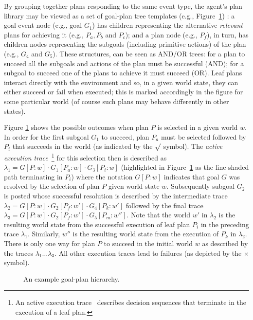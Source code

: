 By grouping together plans responding to the same event type, the agent's plan library may be viewed as a set of goal-plan tree templates (e.g., Figure~\ref{fig:confidence}) \cite{ShawBordini:AAMAS08}: a goal-event node (e.g., goal $G_1$) has children representing the alternative \emph{relevant} plans for achieving it (e.g., $P_a,P_b$ and $P_c$); and a plan node (e.g., $P_f$), in turn, has children nodes representing the subgoals (including primitive actions) of the plan (e.g., $G_4$ and $G_5$). These structures, can be seen as AND/OR trees: for a plan to succeed all the subgoals and actions of the plan must be successful (AND); for a subgoal to succeed one of the plans to achieve it must succeed (OR). Leaf plans interact directly with the environment and so, in a given world state, they can either succeed or fail when executed; this is marked accordingly in the figure for some particular world (of course such plans may behave differently in other states).


Figure \ref{fig:confidence} shows the possible outcomes when plan $P$ is selected in a given world $w$. In order for the first subgoal $G_1$ to succeed, plan $P_a$ must be selected followed by $P_i$ that succeeds in the world (as indicated by the $\surd$ symbol). The {\em active execution trace}~\footnote{An active execution trace~\cite{singh10:learning} describes decision sequences that terminate in the execution of a leaf plan.} for this selection then is described as $\lambda_1=G[P:w] \cdot G_1[P_a:w] \cdot G_3[P_i:w]$ (highlighted in Figure~\ref{fig:confidence} as the line-shaded path terminating in $P_i$) where the notation $G[P:w]$ indicates that goal $G$ was resolved by the selection of plan $P$ given world state $w$. Subsequently subgoal $G_2$ is posted whose successful resolution is described by the intermediate trace $\lambda_2=G[P:w] \cdot G_2[P_f:w'] \cdot G_4[P_k:w']$ followed by the final trace $\lambda_3=G[P:w] \cdot G_2[P_f:w'] \cdot G_5[P_m:w'']$. Note that the world $w'$ in $\lambda_2$ is the resulting world state from the successful execution of leaf plan $P_i$ in the preceding trace $\lambda_1$. Similarly, $w''$ is the resulting world state from the execution of $P_k$ in $\lambda_2$. There is only one way for plan $P$ to succeed in the initial world $w$ as described by the traces $\lambda_1 \ldots \lambda_3$. All other execution traces lead to failures (as depicted by the $\times$ symbol).

\begin{figure}[t]
\begin{center}
\resizebox{0.8\columnwidth}{!}{

}
\end{center}
\vskip -0.5cm
\caption{An example goal-plan hierarchy.}
\label{fig:confidence}
\end{figure}


